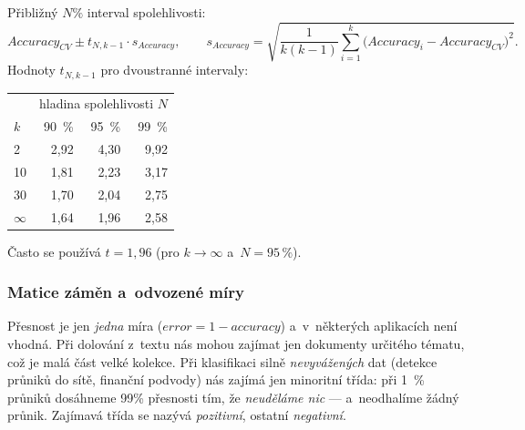 \documentclass[11pt,a4paper]{article}
\theoremstyle{definition}
\begin{document}
\begin{defbox}
Přibližný $N\%$ interval spolehlivosti:
\[ \mathit{Accuracy}_{CV}\pm t_{N,k-1}\cdot s_{\mathit{Accuracy}},\qquad
   s_{\mathit{Accuracy}}=\sqrt{\frac{1}{k(k-1)}\sum_{i=1}^{k}
   \big(\mathit{Accuracy}_i-\mathit{Accuracy}_{CV}\big)^2}. \]
Hodnoty $t_{N,k-1}$ pro dvoustranné intervaly:
\begin{center}
\small
\begin{tabular}{@{}lrrr@{}}
\toprule
& \multicolumn{3}{c}{hladina spolehlivosti $N$} \\
$k$ & 90~\% & 95~\% & 99~\% \\
\midrule
2 & 2,92 & 4,30 & 9,92 \\
10 & 1,81 & 2,23 & 3,17 \\
30 & 1,70 & 2,04 & 2,75 \\
$\infty$ & 1,64 & 1,96 & 2,58 \\
\bottomrule
\end{tabular}
\end{center}
Často se používá $t=1{,}96$ (pro $k\to\infty$ a~$N=95\,\%$).
\end{defbox}

\subsubsection{Matice záměn a~odvozené míry}

Přesnost je jen \emph{jedna} míra ($\mathit{error}=1-\mathit{accuracy}$) a~v~některých
aplikacích není vhodná. Při dolování z~textu nás mohou zajímat jen dokumenty určitého tématu,
což je malá část velké kolekce. Při klasifikaci silně \emph{nevyvážených} dat (detekce
průniků do sítě, finanční podvody) nás zajímá jen minoritní třída: při 1~\% průniků dosáhneme
99\% přesnosti tím, že \emph{neuděláme nic} --- a~neodhalíme žádný průnik. Zajímavá třída se
nazývá \emph{pozitivní}, ostatní \emph{negativní}.
\end{document}
